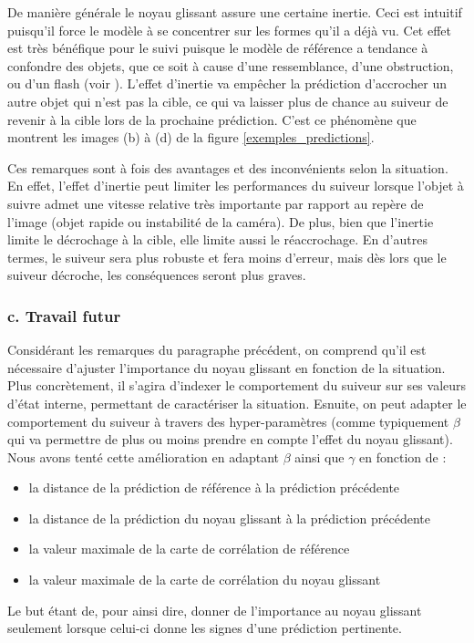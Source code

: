 \documentclass[10pt,twocolumn,letterpaper,french]{article}
\begin{document}
De manière générale le noyau glissant assure une certaine inertie. Ceci est intuitif puisqu'il force le modèle à se concentrer sur les formes qu'il a déjà vu. Cet effet est très bénéfique pour le suivi puisque le modèle de référence a tendance à confondre des objets, que ce soit à cause d'une ressemblance, d'une obstruction, ou d'un flash (voir \textit{}). L'effet d'inertie va empêcher la prédiction d'accrocher un autre objet qui n'est pas la cible, ce qui va laisser plus de chance au suiveur de revenir à la cible lors de la prochaine prédiction. C'est ce phénomène que montrent les images (b) à (d) de la figure  \ref{exemples_predictions}.

Ces remarques sont à fois des avantages et des inconvénients selon la situation. En effet, l'effet d'inertie peut limiter les performances du suiveur lorsque l'objet à suivre admet une vitesse relative très importante par rapport au repère de l'image (objet rapide ou instabilité de la caméra). De plus, bien que l'inertie limite le décrochage à la cible, elle limite aussi le réaccrochage. En d'autres termes, le suiveur sera plus robuste et fera moins d'erreur, mais dès lors que le suiveur décroche, les conséquences seront plus graves.

\subsubsection*{c. Travail futur}

Considérant les remarques du paragraphe précédent, on comprend qu'il est nécessaire d'ajuster l'importance du noyau glissant en fonction de la situation. Plus concrètement, il s'agira d'indexer le comportement du suiveur sur ses valeurs d'état interne, permettant de caractériser la situation. Esnuite, on peut adapter le comportement du suiveur à travers des hyper-paramètres (comme typiquement $\beta$ qui va permettre de plus ou moins prendre en compte l'effet du noyau glissant). Nous avons tenté cette amélioration en adaptant $\beta$ ainsi que $\gamma$ en fonction de :
\begin{itemize}
  \item la distance de la prédiction de référence à la prédiction précédente
  \item la distance de la prédiction du noyau glissant à la prédiction précédente
  \item la valeur maximale de la carte de corrélation de référence
  \item la valeur maximale de la carte de corrélation du noyau glissant
\end{itemize}
Le but étant de, pour ainsi dire, donner de l'importance au noyau glissant seulement lorsque celui-ci donne les signes d'une prédiction pertinente.
\end{document}
